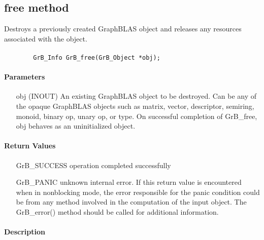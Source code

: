 \subsection{{\sf free} method}

Destroys a previously created GraphBLAS object and releases any resources associated with the object.

\paragraph{\syntax}

\begin{verbatim}
        GrB_Info GrB_free(GrB_Object *obj);
\end{verbatim}


\paragraph{Parameters}

\begin{itemize}[leftmargin=1.1in]
	\item[{\sf obj}] ({\sf INOUT}) An existing GraphBLAS object to be destroyed. 
    Can be any of the opaque GraphBLAS objects such as matrix, vector, descriptor, semiring, monoid, binary op, 
		unary op, or type. On successful completion of {\sf GrB\_free}, {\sf obj} behaves as an uninitialized object.
\end{itemize}

\paragraph{Return Values}

\begin{itemize}[leftmargin=2.1in]
\item[{\sf GrB\_SUCCESS}]        operation completed successfully
\item[{\sf GrB\_PANIC}]          unknown internal error.  If this return
value is encountered when in nonblocking mode, the error responsible for
the panic condition could be from any method involved in the computation
of the input object.  The {\sf GrB\_error()} method should be called
for additional information.
\end{itemize}

\paragraph{Description}

